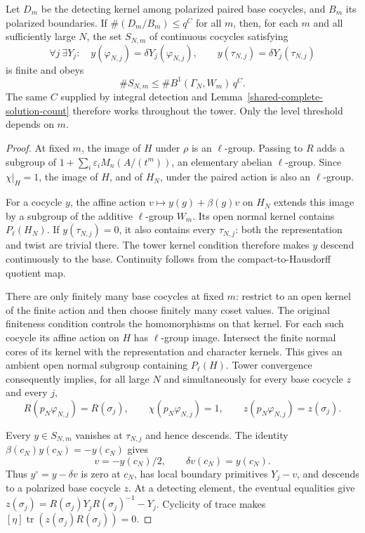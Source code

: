 \begin{proposition}
\label{prop:selmer-tower-detection}
Let $D_m$ be the detecting kernel among polarized paired base
cocycles, and $B_m$ its polarized boundaries. If
$\#(D_m/B_m)\leq q^C$ for all $m$, then, for each $m$ and all
sufficiently large $N$, the set $S_{N,m}$ of continuous cocycles
satisfying
\[
 \forall j\ \exists Y_j:\quad
 y(\varphi_{N,j})=\delta Y_j(\varphi_{N,j}),\qquad
 y(\tau_{N,j})=\delta Y_j(\tau_{N,j})
\]
is finite and obeys
\[
        \#S_{N,m}\leq\#B^1(\Gamma_N,W_m)\,q^C.
\]
The same $C$ supplied by integral detection and
Lemma~\ref{shared-complete-solution-count} therefore works throughout
the tower. Only the level threshold depends on $m$.
\end{proposition}
\begin{proof}
At fixed $m$, the image of $H$ under $\rho$ is an $\ell$-group.
Passing to $R$ adds a subgroup of
$1+\sum_i\varepsilon_iM_n(A/(t^m))$, an elementary abelian
$\ell$-group. Since $\chi|_H=1$, the image of $H$, and of $H_N$,
under the paired action is also an $\ell$-group.

For a cocycle $y$, the affine action $v\mapsto y(g)+\beta(g)v$
on $H_N$ extends this image by a subgroup of the additive
$\ell$-group $W_m$. Its open normal kernel contains $P_\ell(H_N)$.
If $y(\tau_{N,j})=0$, it also contains every $\tau_{N,j}$:
both the representation and twist are trivial there. The tower
kernel condition therefore makes $y$ descend continuously to the
base. Continuity follows from the compact-to-Hausdorff quotient map.

There are only finitely many base cocycles at fixed $m$: restrict to
an open kernel of the finite action and then choose finitely many
coset values. The original finiteness condition controls the
homomorphisms on that kernel. For each such cocycle its affine
action on $H$ has $\ell$-group image. Intersect the finite normal
cores of its kernel with the representation and character kernels.
This gives an ambient open normal subgroup containing $P_\ell(H)$.
Tower convergence consequently implies, for all large $N$ and
simultaneously for every base cocycle $z$ and every $j$,
\[
 R(p_N\varphi_{N,j})=R(\sigma_j),\qquad
 \chi(p_N\varphi_{N,j})=1,\qquad
 z(p_N\varphi_{N,j})=z(\sigma_j).
\]

Every $y\in S_{N,m}$ vanishes at $\tau_{N,j}$ and hence descends.
The identity $\beta(c_N)y(c_N)=-y(c_N)$ gives
\[
 v=-y(c_N)/2,\qquad \delta v(c_N)=y(c_N).
\]
Thus $y^\circ=y-\delta v$ is zero at $c_N$, has local boundary
primitives $Y_j-v$, and descends to a polarized base cocycle
$z$. At a detecting element, the eventual equalities give
$z(\sigma_j)=R(\sigma_j)Y_jR(\sigma_j)^{-1}-Y_j$.
Cyclicity of trace makes
$[\eta]\operatorname{tr}(z(\sigma_j)R(\sigma_j))=0$.


\end{proof}
